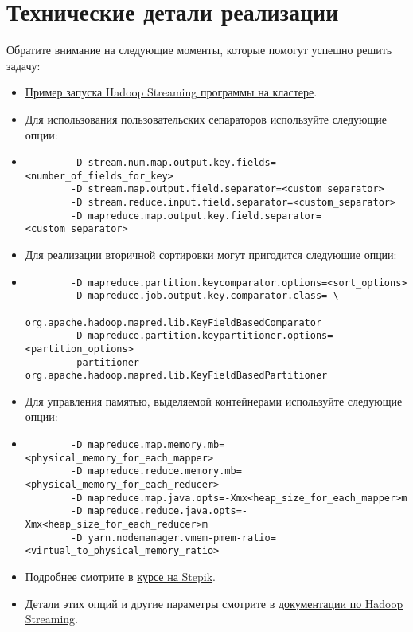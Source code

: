 \documentclass[11pt, fleqn]{article}
\begin{document}
\section{Технические детали реализации}
Обратите внимание на следующие моменты, которые помогут успешно решить задачу:
\begin{itemize}
	\item \href{https://github.com/nakhodnov17/docker-hadoop-spark/tree/master/examples/wordcount_streaming}{Пример запуска Hadoop Streaming программы на кластере}.
	\item Для использования пользовательских сепараторов используйте следующие опции:
	\item[]
		\begin{verbatim}
		-D stream.num.map.output.key.fields=<number_of_fields_for_key> 
		-D stream.map.output.field.separator=<custom_separator>
		-D stream.reduce.input.field.separator=<custom_separator>
		-D mapreduce.map.output.key.field.separator=<custom_separator>
		\end{verbatim}
	\item Для реализации вторичной сортировки могут пригодится следующие опции:
	\item[]
		\begin{verbatim}
		-D mapreduce.partition.keycomparator.options=<sort_options>
		-D mapreduce.job.output.key.comparator.class= \
				org.apache.hadoop.mapred.lib.KeyFieldBasedComparator 
		-D mapreduce.partition.keypartitioner.options=<partition_options>
		-partitioner org.apache.hadoop.mapred.lib.KeyFieldBasedPartitioner
		\end{verbatim}
	\item Для управления памятью, выделяемой контейнерами используйте следующие опции:
	\item[]
		\begin{verbatim}
		-D mapreduce.map.memory.mb=<physical_memory_for_each_mapper> 
		-D mapreduce.reduce.memory.mb=<physical_memory_for_each_reducer> 
		-D mapreduce.map.java.opts=-Xmx<heap_size_for_each_mapper>m 
		-D mapreduce.reduce.java.opts=-Xmx<heap_size_for_each_reducer>m 
		-D yarn.nodemanager.vmem-pmem-ratio=<virtual_to_physical_memory_ratio>
		\end{verbatim}
	\item[] Подробнее смотрите в \href{https://stepik.org/lesson/21001/step/7?unit=5085}{курсе на Stepik}.
	\item Детали этих опций и другие параметры смотрите в \href{https://hadoop.apache.org/docs/current/hadoop-streaming/HadoopStreaming.html}{документации по Hadoop Streaming}.

\end{itemize}
\end{document}
